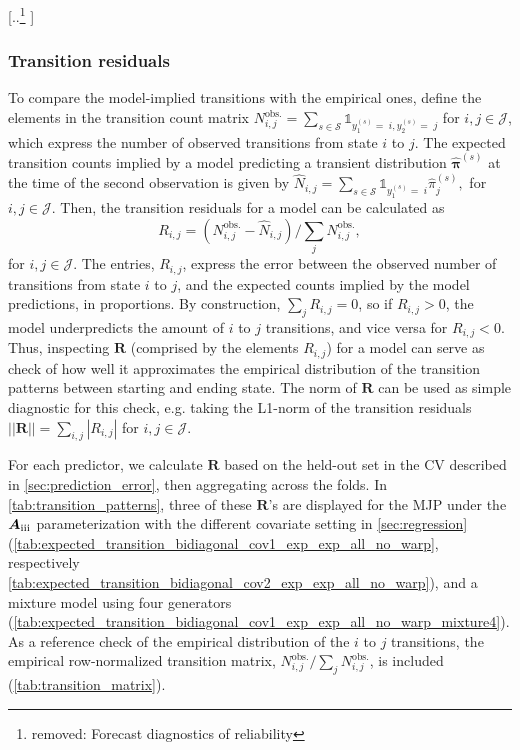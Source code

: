 \documentclass{article}
\newcommand{\RN}[1]{\textup{\uppercase\expandafter{\romannumeral#1}}}
\providecommand{\DIFadd}[1]{{\protect\color{blue} \sf #1}} %
\providecommand{\DIFdel}[1]{{\protect\color{red} [..\footnote{removed: #1} ]}} %
\providecommand{\DIFaddbegin}{} %
\providecommand{\DIFdelbegin}{} %
\providecommand{\DIFdelend}{} %
\begin{document}
\DIFdelbegin %
\DIFdel{Forecast diagnostics of reliability }\DIFdelend \DIFaddbegin \subsubsection{\DIFadd{Transition residuals}} \label{sec:transition_patterns}

\DIFadd{To compare the model-implied transitions with the empirical ones, define the elements in the transition count matrix
$
  N_{i,j}^{\text{obs.}} = \sum_{s \in \mathcal S} \mathds{1}_{y_1^{(s)} =\; i, y_2^{(s)} =\; j}
$ for $i,j \in \mathcal J$, which express the number of observed transitions from state $i$ to $j$. The expected transition counts implied by a model predicting a transient distribution $\widehat{\bm \pi}^{(s)}$ at the time of the second observation is given by
$
\widehat{  N}_{i,j} =  \sum_{s \in \mathcal S} \mathds{1}_{y_1^{(s)} = \; i} \widehat{ \pi}_j^{(s)},
$ for $i,j \in \mathcal J$.
Then, the transition residuals for a model can be calculated as
}$$
  R_{i,j} = \left(  N_{i,j}^{\text{obs.}} - \widehat{  N}_{i,j} \right) / \sum_{j}   N_{i,j}^{\text{obs.}},
$$ \DIFadd{for $i,j \in \mathcal J$.
The entries, $  R_{i,j}$, express the error between the observed number of transitions from state $i$ to $j$, and the expected counts implied by the model predictions, in proportions. 
By construction, $\sum_{j}   R_{i,j} = 0$, so if $  R_{i,j} > 0$, the model underpredicts the amount of $i$ to $j$ transitions, and vice versa for $  R_{i,j} < 0$.
Thus, inspecting $\bm R$ (comprised by the elements $R_{i,j}$) for a model can serve as check of how well it approximates the empirical distribution of the transition patterns between starting and ending state. The norm of $\bm R$ can be used as simple diagnostic for this check, e.g. taking the L1-norm of the transition residuals
$
|| \bm R || = \sum_{i,j} |  R_{i,j}|
$ for $i,j \in \mathcal J$.
}

\DIFadd{For each predictor, we calculate $\bm R$ based on the held-out set in the CV described in \cref{sec:prediction_error}, then aggregating across the folds. In \cref{tab:transition_patterns}, three of these $\bm R$'s are displayed for the MJP under the $\bm{A}_{\RN{3}}$ parameterization with the different covariate setting in \cref{sec:regression} (\cref{tab:expected_transition_bidiagonal_cov1_exp_exp_all_no_warp}, respectively \cref{tab:expected_transition_bidiagonal_cov2_exp_exp_all_no_warp}), and a mixture model using four generators (\cref{tab:expected_transition_bidiagonal_cov1_exp_exp_all_no_warp_mixture4}). As a reference check of the empirical distribution of the $i$ to $j$ transitions, the empirical row-normalized transition matrix, $ N_{i,j}^{\text{obs.}} / \sum_{j}  N_{i,j}^{\text{obs.}}$, is included (\cref{tab:transition_matrix}).
}
\end{document}
